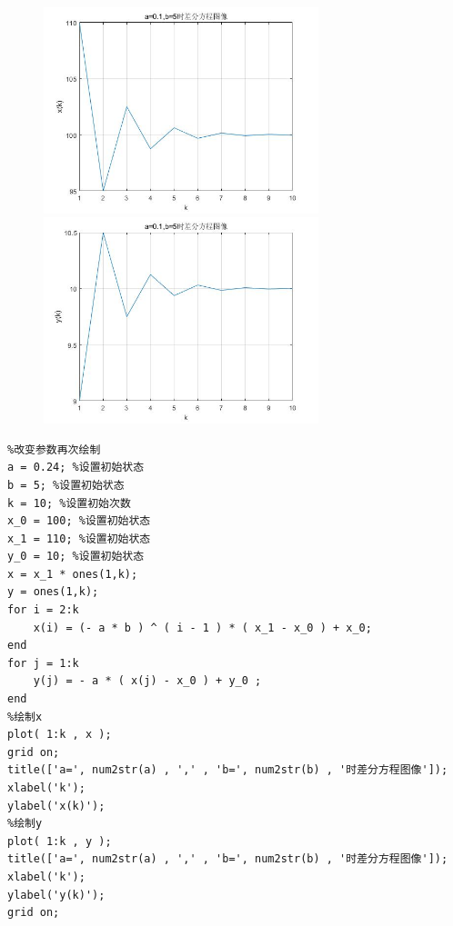 \documentclass{ctexart}
\begin{document}
\begin{figure}[htbp]
\centering
\begin{minipage}[t]{0.48\textwidth}
\centering
\includegraphics[width=8cm]{x1.jpg}
\end{minipage}
\begin{minipage}[t]{0.48\textwidth}
\centering
\includegraphics[width=8cm]{y1.jpg}
\end{minipage}
\end{figure}

\begin{lstlisting}
%改变参数再次绘制
a = 0.24; %设置初始状态
b = 5; %设置初始状态
k = 10; %设置初始次数
x_0 = 100; %设置初始状态
x_1 = 110; %设置初始状态
y_0 = 10; %设置初始状态
x = x_1 * ones(1,k);
y = ones(1,k);
for i = 2:k
    x(i) = (- a * b ) ^ ( i - 1 ) * ( x_1 - x_0 ) + x_0;
end
for j = 1:k
    y(j) = - a * ( x(j) - x_0 ) + y_0 ;
end
%绘制x
plot( 1:k , x );
grid on;
title(['a=', num2str(a) , ',' , 'b=', num2str(b) , '时差分方程图像']);
xlabel('k');
ylabel('x(k)');
%绘制y
plot( 1:k , y );
title(['a=', num2str(a) , ',' , 'b=', num2str(b) , '时差分方程图像']);
xlabel('k');
ylabel('y(k)');
grid on;
\end{lstlisting}
\end{document}
